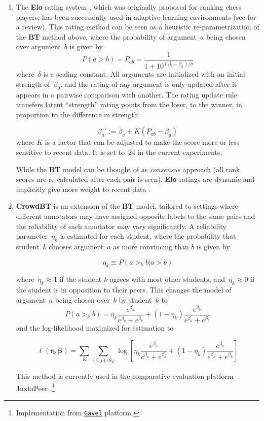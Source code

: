 \documentclass[notitlepage,12pt]{jedm}
\begin{document}
\begin{enumerate}
	
	\item The \textbf{Elo} rating system \cite{elo_rating_1978}, which was 
	originally proposed for ranking chess players, has been successfully used 
	in adaptive learning environments (see  
	for 
	a review). 
	This rating method can be seen as a heuristic re-parametrization of the 
	\textbf{BT} method above, where the probability of argument~$a$ being 
	chosen over argument~$b$ is given by
	$$
	P(a>b) = P_{ab} = \frac{1}{1+10^{(\beta_b-\beta_a)/\delta}}
	$$
	where~$\delta$ is a scaling constant. 
	All arguments are initialized with an initial strength of~$\beta_0$, and 
	the rating of any argument is only updated after it appears in a pairwise 
	comparison with another.
	The rating update rule transfers latent ``strength'' rating points from the 
	loser, to the winner, in proportion to the difference in strength:
	
	$$
	\beta_a':=\beta_a+K(P_{ab} - \beta_a)
	$$
        where $K$ is a factor that can be adjusted to make the score more or less
        sensitive to recent data. It is set to~24 in the current experiments.
	
	While the \textbf{BT} model can be thought of as \textit{consensus} 
	approach (all rank scores are re-calculated after each pair is seen), 
	\textbf{Elo} ratings are dynamic and implicitly give more weight 
	to recent data \cite{aldous_elo_2017}.
	
	\item \textbf{CrowdBT} \cite{chen_pairwise_2013} is an extension of the 
	\textbf{BT} model, tailored to settings where different annotators may have 
	assigned opposite labels to the same pairs and the reliability of each 
	annotator may vary significantly. 
	A reliability parameter~$\eta_k$ is estimated for each student, where the 
	probability that student~$k$ chooses argument~$a$ as more convincing than 
	$b$ is given by 
	
	$$
	\eta_k \equiv P(a >_k b | a >b )
	$$
	
	where~$\eta_k \approx 1$ if the student  $k$ agrees with most other 
	students, and~$\eta_k \approx 0$ if the student is in opposition to their 
	peers.
	This changes the model of argument~$a$ being chosen over~$b$ by student~$k$ 
	to 
	$$
	P(a >_k b) = 
	\eta_k \frac{e^{\beta_a}}{e^{\beta_a}+e^{\beta_b}} + (1-\eta_k) 
	\frac{e^{\beta_b}}{e^{\beta_a}+e^{\beta_b}}
	$$
	and the log-likelihood maximized for estimation to 
	
	$$
	\ell(\boldsymbol{\eta},\boldsymbol{\beta})=\sum_{K}\sum_{(i,j)\epsilon 
		S_K}^{} 
	\log \left[ \eta_k \frac{e^{\beta_a}}{e^{\beta_a}+e^{\beta_b}} + (1-\eta_k) 
	\frac{e^{\beta_b}}{e^{\beta_a}+e^{\beta_b}} \right]
	$$
	
	This method is currently used in the comparative evaluation platform 
	JuxtaPeer \cite{cambre_juxtapeer:_2018}.\footnote{Implementation from 
	\href{https://github.com/anishathalye/gavel/blob/master/gavel/crowd_bt.py}{\texttt{Gavel}}
	 platform.}
	
\end{enumerate}
\end{document}
